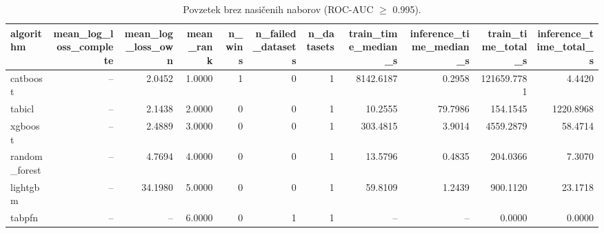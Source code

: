 \begin{table}[htbp]
\centering
\caption{Povzetek brez nasičenih naborov (ROC-AUC $\geq$ 0.995).}
\label{tab:overall-nonsat}
\begin{tabular}{lrrrrrrrrrr}
\hline
algorithm & mean\_log\_loss\_complete & mean\_log\_loss\_own & mean\_rank & n\_wins & n\_failed\_datasets & n\_datasets & train\_time\_median\_s & inference\_time\_median\_s & train\_time\_total\_s & inference\_time\_total\_s \\
\hline
catboost & -- & 2.0452 & 1.0000 & 1 & 0 & 1 & 8142.6187 & 0.2958 & 121659.7781 & 4.4420 \\
tabicl & -- & 2.1438 & 2.0000 & 0 & 0 & 1 & 10.2555 & 79.7986 & 154.1545 & 1220.8968 \\
xgboost & -- & 2.4889 & 3.0000 & 0 & 0 & 1 & 303.4815 & 3.9014 & 4559.2879 & 58.4714 \\
random\_forest & -- & 4.7694 & 4.0000 & 0 & 0 & 1 & 13.5796 & 0.4835 & 204.0366 & 7.3070 \\
lightgbm & -- & 34.1980 & 5.0000 & 0 & 0 & 1 & 59.8109 & 1.2439 & 900.1120 & 23.1718 \\
tabpfn & -- & -- & 6.0000 & 0 & 1 & 1 & -- & -- & 0.0000 & 0.0000 \\
\hline
\end{tabular}
\end{table}
